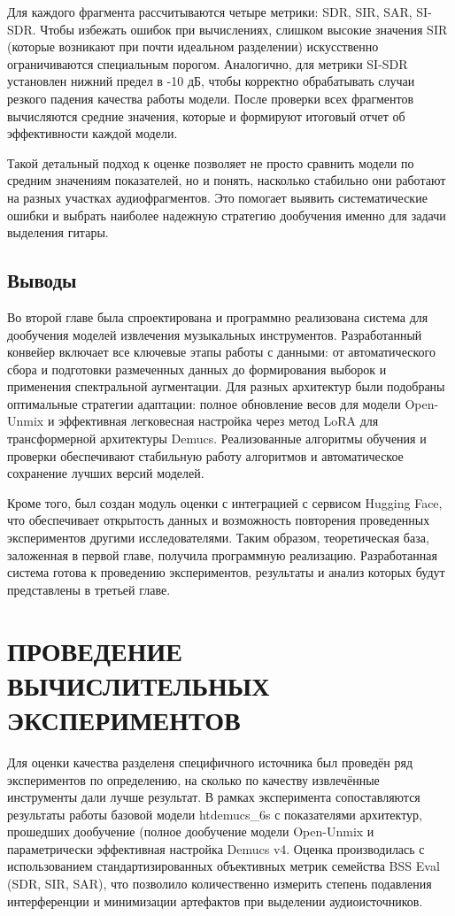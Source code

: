 \documentclass[14pt]{extarticle}
\begin{document}
Для каждого фрагмента рассчитываются четыре метрики: SDR, SIR, SAR, SI-SDR.
Чтобы избежать ошибок при вычислениях, слишком высокие значения SIR (которые возникают при почти идеальном разделении) 
искусственно ограничиваются специальным порогом. 
Аналогично, для метрики SI-SDR установлен нижний предел в -10 дБ, чтобы корректно обрабатывать случаи резкого падения качества работы модели. 
После проверки всех фрагментов вычисляются средние значения, которые и формируют итоговый отчет об эффективности каждой модели.

Такой детальный подход к оценке позволяет не просто сравнить модели по средним значениям показателей, но и понять, 
насколько стабильно они работают на разных участках аудиофрагментов.
Это помогает выявить систематические ошибки и выбрать наиболее надежную стратегию дообучения именно для задачи выделения гитары.

\subsection{Выводы}
Во второй главе была спроектирована и программно реализована система для дообучения моделей извлечения музыкальных инструментов.
Разработанный конвейер включает все ключевые этапы работы с данными: от автоматического сбора и подготовки размеченных данных 
до формирования выборок и применения спектральной аугментации. 
Для разных архитектур были подобраны оптимальные стратегии адаптации: полное обновление весов для модели Open-Unmix и эффективная легковесная
настройка через метод LoRA для трансформерной архитектуры Demucs. 
Реализованные алгоритмы обучения и проверки обеспечивают стабильную работу алгоритмов и автоматическое сохранение лучших версий моделей.

Кроме того, был создан модуль оценки с интеграцией с сервисом Hugging Face, что обеспечивает открытость данных и возможность повторения 
проведенных экспериментов другими исследователями. 
Таким образом, теоретическая база, заложенная в первой главе, получила программную реализацию. 
Разработанная система готова к проведению экспериментов, результаты и анализ которых будут представлены в третьей главе.

\section{\MakeUppercase{Проведение вычислительных экспериментов}}

Для оценки качества разделеня специфичного источника был проведён ряд экспериментов по определению, на сколько по качеству извлечённые инструменты
дали лучше результат.
В рамках эксперимента сопоставляются результаты работы базовой модели htdemucs\_6s 
с показателями архитектур, прошедших дообучение (полное дообучение модели Open-Unmix и параметрически 
эффективная настройка Demucs v4. 
Оценка производилась с использованием стандартизированных объективных метрик семейства BSS Eval 
(SDR, SIR, SAR), что позволило количественно измерить степень подавления интерференции и 
минимизации артефактов при выделении аудиоисточников.
\end{document}

